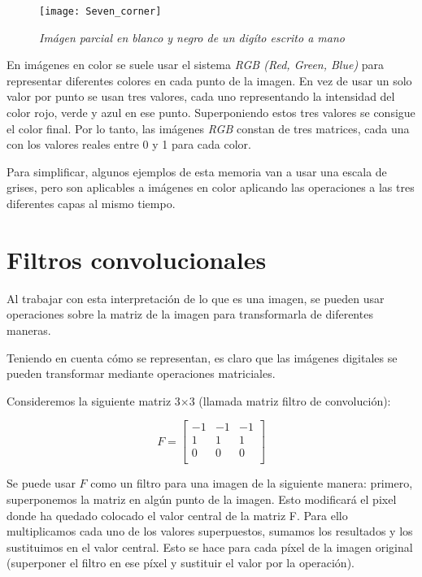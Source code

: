 \begin{figure}
    \centering
    \caption{\textit{Imágen parcial en blanco y negro de un digíto escrito a mano}}
  \label{Seven_corner}
  \texttt{[image: Seven\_corner]}
\end{figure}

En imágenes en color se suele usar el sistema \textit{RGB (Red, Green, Blue)} para representar diferentes colores en cada punto de la imagen. En vez de usar un solo valor por punto se usan tres valores, cada uno representando la intensidad del color rojo, verde y azul en ese punto. Superponiendo estos tres valores se consigue el color final. Por lo tanto, las imágenes \textit{RGB} constan de tres matrices, cada una con los valores reales entre 0 y 1 para cada color.

Para simplificar, algunos ejemplos de esta memoria van a usar una escala de grises, pero son aplicables a imágenes en color aplicando las operaciones a las tres diferentes capas al mismo tiempo.

\section{Filtros convolucionales}

Al trabajar con esta interpretación de lo que es una imagen, se pueden usar operaciones sobre la matriz de la imagen para transformarla de diferentes maneras.

Teniendo en cuenta cómo se representan, es claro que las imágenes digitales se pueden transformar mediante operaciones matriciales.

Consideremos la siguiente matriz 3$\times$3 (llamada matriz filtro de convolución):

\[
  F=
  \left[ {\begin{array}{ccc}
   -1 & -1 & -1 \\
   1 & 1 & 1 \\
   0 & 0 & 0 \\
  \end{array} } \right]
\]

Se puede usar $F$ como un filtro para una imagen de la siguiente manera: primero, superponemos la matriz en algún punto de la imagen. Esto modificará el pixel donde ha quedado colocado el valor central de la matriz F. Para ello multiplicamos cada uno de los valores superpuestos, sumamos los resultados y los sustituimos en el valor central. Esto se hace para cada píxel de la imagen original (superponer el filtro en ese píxel y sustituir el valor por la operación).

